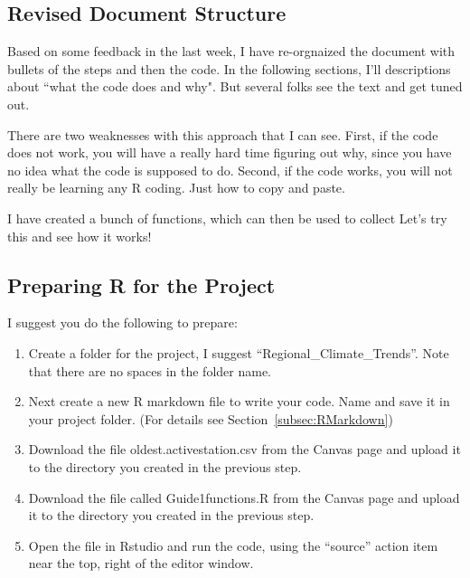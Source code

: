 \documentclass{article}\usepackage[]{graphicx}\usepackage[dvipsnames]{xcolor}
\begin{document}

\subsection{Revised Document Structure}

Based on some feedback in the last week, I have re-orgnaized the document with bullets of the steps and then the code. In the following sections, I'll descriptions about ``what the code does and why". But several folks see the text and get tuned out.

There are two weaknesses with this approach that I can see. First, if the code does not work, you will have a really hard time figuring out why, since you have no idea what the code is supposed to do. Second, if the code works, you will not really be learning any R coding. Just how to copy and paste.

I have created a bunch of functions, which can then be used to collect Let's try this and see how it works! 

\subsection{Preparing R for the Project}

I suggest you do the following to prepare: 

\begin{enumerate}
  \item Create a folder for the project, I suggest ``Regional\_Climate\_Trends''. Note that there are no spaces in the folder name. 
  \item Next create a new R markdown file to write your code. Name and save it in your project folder. (For details see Section~\ref{subsec:RMarkdown})
  \item Download the file oldest.activestation.csv from the Canvas page and upload it to the directory you created in the previous step.
  \item Download the file called Guide1functions.R from the Canvas page and upload it to the directory you created in the previous step. 
  \item Open the file in Rstudio and run the code, using the ``source'' action item near the top, right of the editor window.
\end{enumerate}
\end{document}
